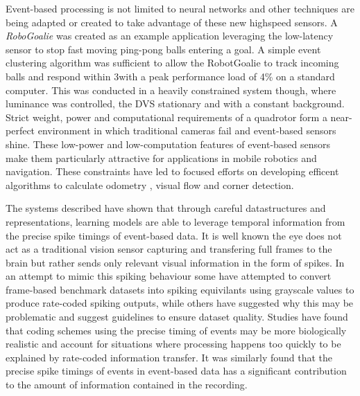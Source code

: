 Event-based processing is not limited to neural networks and other techniques are being adapted or created to take advantage of these new highspeed sensors\cite{ni2015visual}.
A \textit{RoboGoalie} was created as an example application leveraging the low-latency sensor to stop fast moving ping-pong balls entering a goal\cite{delbruck2007fast}. 
A simple event clustering algorithm was sufficient to allow the RobotGoalie to track incoming balls and respond within 3\ms with a peak performance load of 4\% on a standard computer. 
This was conducted in a heavily constrained system though, where luminance was controlled, the DVS stationary and with a constant background. 
Strict weight, power and computational requirements of a quadrotor form a near-perfect environment in which traditional cameras fail and event-based sensors shine\cite{mueggler2014event}.
These low-power and low-computation features of event-based sensors make them particularly attractive for applications in mobile robotics and navigation\cite{weikersdorfer2013simultaneous, milford2015place}.
These constraints have led to focused efforts on developing efficent algorithms to calculate odometry \cite{censi2014low}, visual flow \cite{benosman2014event} and corner detection\cite{clady2015asynchronous}.


The systems described have shown that through careful datastructures and representations, learning models are able to leverage temporal information from the precise spike timings of event-based data. 
It is well known the eye does not act as a traditional vision sensor capturing and transfering full frames to the brain but rather sends only relevant visual information in the form of spikes\cite{delbruck2010activity}.
In an attempt to mimic this spiking behaviour some have attempted to convert frame-based benchmark datasets into spiking equivilants using grayscale values to produce rate-coded spiking outputs, while others have suggested why this may be problematic \cite{akolkar2015can} and suggest guidelines to ensure dataset quality\cite{tan2015benchmarking}.
Studies have found that coding schemes using the precise timing of events may be more biologically realistic and account for situations where processing happens too quickly to be explained by rate-coded information transfer\cite{thorpe2001spike}. 
It was similarly found that the precise spike timings of events in event-based data has a significant contribution to the amount of information contained in the recording\cite{akolkar2015can}.


